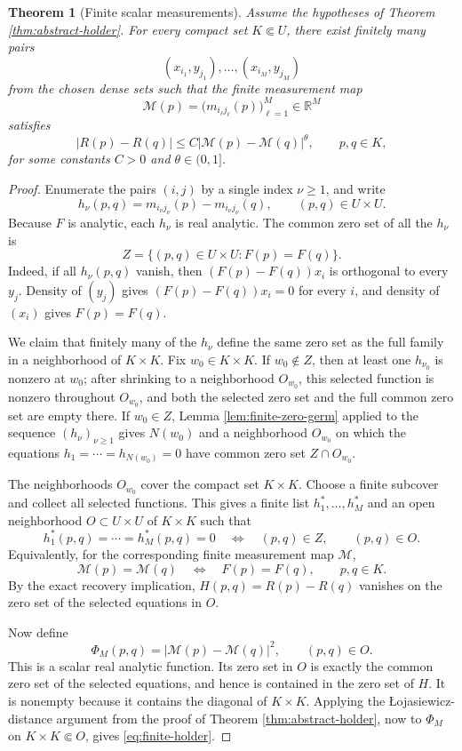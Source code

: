 \documentclass[12pt,oneside]{amsart}
\newtheorem{theorem}{Theorem}[section]
\newcommand{\R}{\mathbb R}
\newcommand{\cM}{\mathcal M}
\begin{document}
\begin{theorem}[Finite scalar measurements]\label{thm:finite-measurements}
Assume the hypotheses of Theorem \ref{thm:abstract-holder}.  For every compact set $K\Subset U$, there exist finitely many pairs
\[
        (x_{i_1},y_{j_1}),\ldots,(x_{i_M},y_{j_M})
\]
from the chosen dense sets such that the finite measurement map
\[
        \cM(p)=\bigl(m_{i_\ell j_\ell}(p)\bigr)_{\ell=1}^M\in\R^M
\]
satisfies
\begin{equation}\label{eq:finite-holder}
        |R(p)-R(q)|
        \le C|\cM(p)-\cM(q)|^\theta,
        \qquad p,q\in K,
\end{equation}
for some constants $C>0$ and $\theta\in(0,1]$.
\end{theorem}


\begin{proof}
Enumerate the pairs $(i,j)$ by a single index $\nu\ge1$, and write
\[
        h_\nu(p,q)=m_{i_\nu j_\nu}(p)-m_{i_\nu j_\nu}(q),
        \qquad (p,q)\in U\times U .
\]
Because $F$ is analytic, each $h_\nu$ is real analytic.  The common zero set of
all the $h_\nu$ is
\[
        Z=\{(p,q)\in U\times U:F(p)=F(q)\}.
\]
Indeed, if all $h_\nu(p,q)$ vanish, then $(F(p)-F(q))x_i$ is orthogonal to
every $y_j$.  Density of $(y_j)$ gives $(F(p)-F(q))x_i=0$ for every $i$, and
density of $(x_i)$ gives $F(p)=F(q)$.

We claim that finitely many of the $h_\nu$ define the same zero set as the full
family in a neighborhood of $K\times K$.  Fix $w_0\in K\times K$.  If
$w_0\notin Z$, then at least one $h_{\nu_0}$ is nonzero at $w_0$; after
shrinking to a neighborhood $O_{w_0}$, this selected function is nonzero
throughout $O_{w_0}$, and both the selected zero set and the full common zero set
are empty there.  If $w_0\in Z$, Lemma \ref{lem:finite-zero-germ} applied to the
sequence $(h_\nu)_{\nu\ge1}$ gives $N(w_0)$ and a neighborhood $O_{w_0}$ on
which the equations $h_1=\cdots=h_{N(w_0)}=0$ have common zero set
$Z\cap O_{w_0}$.

The neighborhoods $O_{w_0}$ cover the compact set $K\times K$.  Choose a finite
subcover and collect all selected functions.  This gives a finite list
$h_1^*,\ldots,h_M^*$ and an open neighborhood $O\subset U\times U$ of
$K\times K$ such that
\[
        h_1^*(p,q)=\cdots=h_M^*(p,q)=0
        \quad\Longleftrightarrow\quad
        (p,q)\in Z,
        \qquad (p,q)\in O .
\]
Equivalently, for the corresponding finite measurement map $\cM$,
\[
        \cM(p)=\cM(q)
        \quad\Longleftrightarrow\quad
        F(p)=F(q),
        \qquad p,q\in K .
\]
By the exact recovery implication, $H(p,q)=R(p)-R(q)$ vanishes on the zero set
of the selected equations in $O$.

Now define
\[
        \Phi_M(p,q)=|\cM(p)-\cM(q)|^2,
        \qquad (p,q)\in O .
\]
This is a scalar real analytic function.  Its zero set in $O$ is exactly the
common zero set of the selected equations, and hence is contained in the zero
set of $H$.  It is nonempty because it contains the diagonal of $K\times K$.
Applying the \L{}ojasiewicz-distance argument from the proof of Theorem
\ref{thm:abstract-holder}, now to $\Phi_M$ on $K\times K\Subset O$, gives
\eqref{eq:finite-holder}.
\end{proof}
\end{document}
